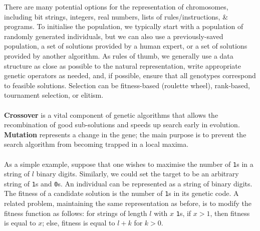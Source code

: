 \documentclass[a4paper,11pt]{article}
\begin{document}
There are many potential options for the representation of chromosomes, including bit strings, integers, real numbers, lists of rules/instructions, \& programs.
To initialise the population, we typically start with a population of randomly generated individuals, but we can also use a previously-saved population, a set of solutions provided by a human expert, or a set of solutions provided by another algorithm.
As rules of thumb, we generally use a data structure as close as possible to the natural representation, write appropriate genetic operators as needed, and, if possible, ensure that all genotypes correspond to feasible solutions.
Selection can be fitness-based (roulette wheel), rank-based, tournament selection, or elitism.
\\\\
\textbf{Crossover} is a vital component of genetic algorithms that allows the recombination of good sub-solutions and speeds up search early in evolution.
\textbf{Mutation} represents a change in the gene; the main purpose is to prevent the search algorithm from becoming trapped in a local maxima.
\\\\
As a simple example, suppose that one wishes to maximise the number of \verb|1|s in a string of $l$ binary digits.
Similarly, we could set the target to be an arbitrary string of \verb|1|s and \verb|0|s.
An individual can be represented as a string of binary digits.
The fitness of a candidate solution is the number of \verb|1|s in its genetic code.
A related problem, maintaining the same representation as before, is to modify the fitness function as follows:
for strings of length $l$ with $x$ \verb|1|s, if $x > 1$, then fitness is equal to $x$; else, fitness is equal to $l+k$ for $k>0$.
\end{document}
